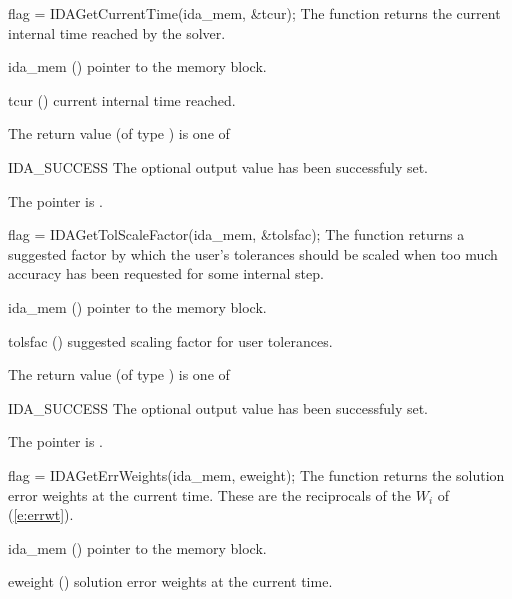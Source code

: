 {
  flag = IDAGetCurrentTime(ida\_mem, \&tcur);
}
{
  The function  returns the
  current internal time reached by the solver.
}
{
  \begin{args}
  \item[ida\_mem] ()
    pointer to the {\ida} memory block.
  \item[tcur] ()
    current internal time reached.
  \end{args}
}
{
  The return value  (of type ) is one of
  \begin{args}
  \item[IDA\_SUCCESS] 
    The optional output value has been successfuly set.
  \item[\Id{IDA\_MEM\_NULL}]
    The  pointer is .
  \end{args}
}
{}
{
  flag = IDAGetTolScaleFactor(ida\_mem, \&tolsfac);
}
{
  The function  returns a
  suggested factor by which the user's tolerances 
  should be scaled when too much accuracy has been 
  requested for some internal step.
}
{
  \begin{args}[tolsfac]
  \item[ida\_mem] ()
    pointer to the {\ida} memory block.
  \item[tolsfac] ()
    suggested scaling factor for user tolerances.
  \end{args}
}
{
  The return value  (of type ) is one of
  \begin{args}
  \item[IDA\_SUCCESS] 
    The optional output value has been successfuly set.
  \item[\Id{IDA\_MEM\_NULL}]
    The  pointer is .
  \end{args}
}
{}
{
  flag = IDAGetErrWeights(ida\_mem, eweight);
}
{
  The function  returns the solution error weights 
  at the current time. These are the reciprocals of the $W_i$ of (\ref{e:errwt}).
}
{
  \begin{args}[eweight]
  \item[ida\_mem] ()
    pointer to the {\ida} memory block.
  \item[eweight] ()
    solution error weights at the current time.
  \end{args}
}
